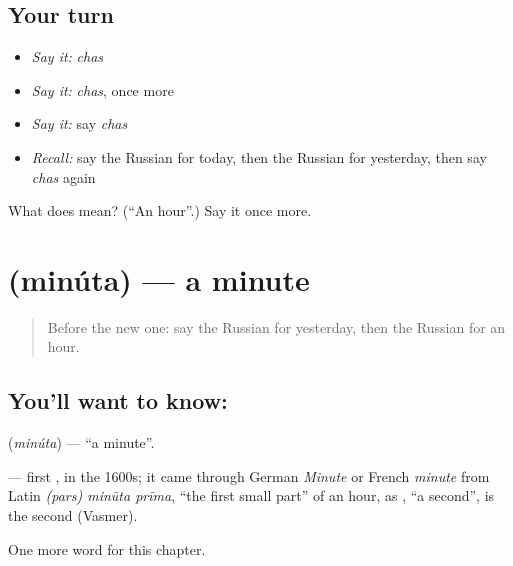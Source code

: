 \subsection*{Your turn}
\begin{itemize}
\raggedright
  \item \emph{Say it:} \emph{chas}
  \item \emph{Say it:} \emph{chas}, once more
  \item \emph{Say it:} say \emph{chas}
  \item \emph{Recall:} say the Russian for today, then the Russian for yesterday, then say \emph{chas} again
\end{itemize}

\begin{tcolorbox}[breakable,colback=teal!4,colframe=teal!35!black,title={Before you move on}]
What does  mean? (\textquotedblleft{}An hour\textquotedblright{}.) Say it once more.
\end{tcolorbox}
\section[\texorpdfstring{\ru{минута} (minúta)}{минута (minúta)}]{ (minúta) — a minute}

\label{lesson:RU-C69-minute}



\begin{quote}
Before the new one: say the Russian for yesterday, then the Russian for an hour.
\end{quote}

\subsection*{You'll want to know: }
\textbf{} (\emph{minúta}) — \textquotedblleft{}a minute\textquotedblright{}.

\begin{cousinweb}
\textbf{} — first \emph{}, in the 1600s; it came through German \emph{Minute} or French \emph{minute} from Latin \emph{(pars) minūta prīma}, \textquotedblleft{}the first small part\textquotedblright{} of an hour, as \emph{}, \textquotedblleft{}a second\textquotedblright{}, is the second (Vasmer).
\end{cousinweb}

\begin{grammarlens}[title={What you've built}]
One more word for this chapter.
\end{grammarlens}

